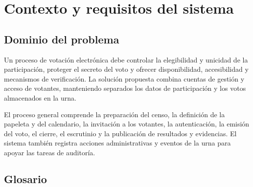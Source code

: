 \chapter{Contexto y requisitos del sistema}
\label{cap:contexto-requisitos}

\section{Dominio del problema}
\label{sec:dominio}

Un proceso de votación electrónica debe controlar la elegibilidad y unicidad
de la participación, proteger el secreto del voto y ofrecer disponibilidad,
accesibilidad y mecanismos de verificación. La solución propuesta combina
cuentas de gestión y acceso de votantes, manteniendo separados los datos de
participación y los votos almacenados en la urna.

El proceso general comprende la preparación del censo, la definición de la
papeleta y del calendario, la invitación a los votantes, la autenticación, la
emisión del voto, el cierre, el escrutinio y la publicación de resultados y
evidencias. El sistema también registra acciones administrativas y eventos de
la urna para apoyar las tareas de auditoría.

\section{Glosario}
\label{sec:glosario}

